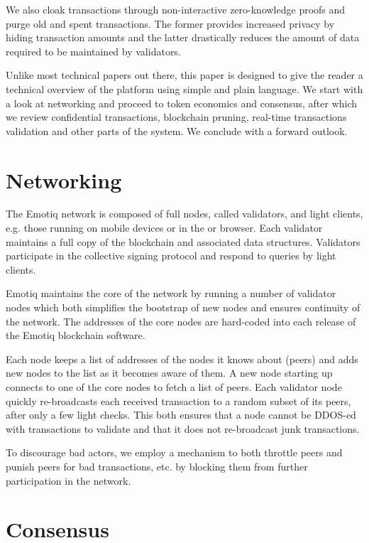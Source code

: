 \documentclass{yellowpaper}
\begin{document}
We also cloak transactions through non-interactive zero-knowledge proofs and purge old and spent transactions. The former provides increased privacy by hiding transaction amounts and the latter drastically reduces the amount of data required to be maintained by validators.

Unlike most technical papers out there, this paper is designed to give the reader a technical overview of the platform using simple and plain language. We start with a look at networking and proceed to token economics and consensus, after which we review confidential transactions, blockchain pruning, real-time transactions validation and other parts of the system. We conclude with a forward outlook.

\section{Networking}
The Emotiq network is composed of full nodes, called validators, and light clients, e.g. those running on mobile devices or in the or browser. Each validator maintains a full copy of the blockchain and associated data structures. Validators participate in the collective signing protocol and respond to queries by light clients. 

Emotiq maintains the core of the network by running a number of validator nodes which both simplifies the bootstrap of new nodes and ensures continuity of the network. The addresses of the core nodes are hard-coded into each release of the Emotiq blockchain software.

Each node keeps a list of addresses of the nodes it knows about (peers) and adds new nodes to the list as it becomes aware of them. A new node starting up connects to one of the core nodes to fetch a list of peers. Each validator node quickly re-broadcasts each received transaction to a random subset of its peers, after only a few light checks. This both ensures that a node cannot be DDOS-ed with transactions to validate and that it does not re-broadcast junk transactions.

To discourage bad actors, we employ a mechanism to both throttle peers and punish peers for bad transactions, etc. by blocking them from further participation in the network.

\section{Consensus}

\end{document}
